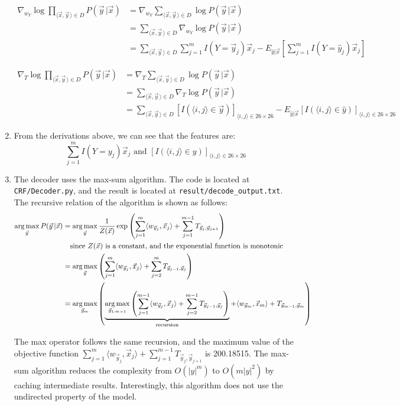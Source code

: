 \documentclass[11pt,a4paper]{article}
\begin{document}
\begin{enumerate}[label=(\alph*)]
\begin{align*}
\nabla_{w_Y}\log\prod_{\langle\vec{x},\vec{y}\,\rangle\in D}P(\vec{y}\,|\vec{x})&=\nabla_{w_Y}\sum_{\langle\vec{x},\vec{y}\,\rangle\in D}\log P(\vec{y}\,|\vec{x})\\
&=\sum_{\langle\vec{x},\vec{y}\,\rangle\in D}\nabla_{w_Y}\log P(\vec{y}\,|\vec{x})\\
&=\sum_{\langle\vec{x},\vec{y}\,\rangle\in D}\sum_{j=1}^m I(Y=\vec{y}_j)\vec{x}_j-E_{\hat{y}|\vec{x}}\left[\sum_{j=1}^m I(Y=\hat{y}_j)\vec{x}_j\right]
\end{align*}

\begin{align*}
\nabla_T\log\prod_{\langle\vec{x},\vec{y}\,\rangle\in D}P(\vec{y}\,|\vec{x})&=\nabla_T\sum_{\langle\vec{x},\vec{y}\,\rangle\in D}\log P(\vec{y}\,|\vec{x})\\
&=\sum_{\langle\vec{x},\vec{y}\,\rangle\in D}\nabla_T\log P(\vec{y}\,|\vec{x})\\
&=\sum_{\langle\vec{x},\vec{y}\,\rangle\in D}[I(\langle i,j\rangle\in\vec{y})]_{\langle i,j\rangle \in 26\times 26}-E_{\hat{y}|\vec{x}}[I(\langle i,j\rangle\in\hat{y})]_{\langle i,j\rangle \in 26\times 26}
\end{align*}

\item
From the derivations above, we can see that the features are:
\[\sum_{j=1}^m I(Y=y_j)\vec{x}_j\text{ and }[I(\langle i,j\rangle\in y)]_{\langle i,j\rangle \in 26\times 26}\]

\item
The decoder uses the max-sum algorithm. The code is located at \texttt{CRF/Decoder.py}, and the result is located at \texttt{result/decode\_output.txt}. The recursive relation of the algorithm is shown as follows:
\begin{align*}
\operatorname*{arg\,max}_{\vec{y}}P(\vec{y}\,|\vec{x})&=\operatorname*{arg\,max}_{\vec{y}}\frac{1}{Z(\vec{x})}\exp\left(\sum_{j=1}^m\langle w_{\vec{y}_j},\vec{x}_j\rangle+\sum_{j=1}^{m-1}T_{\vec{y}_j,\vec{y}_{j+1}}\right)\\
&\quad\text{since }Z(\vec{x})\text{ is a constant, and the exponential function is monotonic}\\
&=\operatorname*{arg\,max}_{\vec{y}}\left(\sum_{j=1}^m\langle w_{\vec{y}_j},\vec{x}_j\rangle+\sum_{j=2}^m T_{\vec{y}_{j-1},\vec{y}_j}\right)\\
&=\operatorname*{arg\,max}_{\vec{y}_m}\left(\underbrace{\operatorname*{arg\,max}_{\vec{y}_{1:m-1}}\left(\sum_{j=1}^{m-1}\langle w_{\vec{y}_j},\vec{x}_j\rangle+\sum_{j=2}^{m-1} T_{\vec{y}_{j-1},\vec{y}_j}\right)}_\text{recursion}+\langle w_{\vec{y}_m},\vec{x}_m\rangle+T_{\vec{y}_{m-1},\vec{y}_m}\right)
\end{align*}

The max operator follows the same recursion, and the maximum value of the objective function $\sum_{j=1}^m\langle w_{\vec{y}_j},\vec{x}_j\rangle+\sum_{j=1}^{m-1}T_{\vec{y}_j,\vec{y}_{j+1}}$ is 200.18515. The max-sum algorithm reduces the complexity from $O(|y|^m)$ to $O(m|y|^2)$ by caching intermediate results. Interestingly, this algorithm does not use the undirected property of the model.
\end{enumerate}
\end{document}
